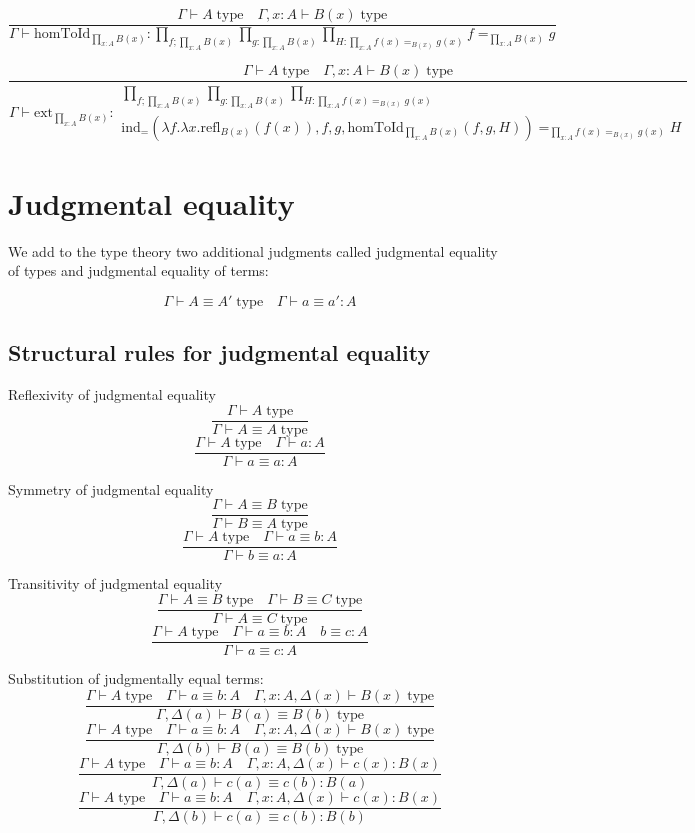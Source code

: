 \documentclass{book}
\begin{document}
$$\frac{\Gamma \vdash A \; \mathrm{type} \quad \Gamma, x:A \vdash B(x) \; \mathrm{type}}{\Gamma \vdash \mathrm{homToId}_{\prod_{x:A} B(x)}:\prod_{f;\prod_{x:A} B(x)} \prod_{g:\prod_{x:A} B(x)} \prod_{H:\prod_{x:A} f(x) =_{B(x)} g(x)} f =_{\prod_{x:A} B(x)} g}$$

$$\frac{\Gamma \vdash A \; \mathrm{type} \quad \Gamma, x:A \vdash B(x) \; \mathrm{type}}{\Gamma \vdash \mathrm{ext}_{\prod_{x:A} B(x)}:
\begin{array}{l}
	\prod_{f;\prod_{x:A} B(x)} \prod_{g:\prod_{x:A} B(x)} \prod_{H:\prod_{x:A} f(x) =_{B(x)} g(x)} \\
	\mathrm{ind}_{=}(\lambda f.\lambda x.\mathrm{refl}_{B(x)}(f(x)), f, g, \mathrm{homToId}_{\prod_{x:A} B(x)}(f, g, H)) =_{\prod_{x:A} f(x) =_{B(x)} g(x)} H
\end{array}
}$$

\section{Judgmental equality}

We add to the type theory two additional judgments called judgmental equality of types and judgmental equality of terms:

$$\Gamma \vdash A \equiv A' \; \mathrm{type} \quad \Gamma \vdash a \equiv a':A$$

\subsection{Structural rules for judgmental equality}

Reflexivity of judgmental equality
$$\frac{\Gamma \vdash A \; \mathrm{type}}{\Gamma \vdash A \equiv A \; \mathrm{type}}$$
$$\frac{\Gamma \vdash A \; \mathrm{type} \quad \Gamma \vdash a:A}{\Gamma \vdash a \equiv a:A}$$

Symmetry of judgmental equality
$$\frac{\Gamma \vdash A \equiv B \; \mathrm{type}}{\Gamma \vdash B \equiv A \; \mathrm{type}}$$ 
$$\frac{\Gamma \vdash A \; \mathrm{type} \quad \Gamma \vdash a \equiv b:A}{\Gamma \vdash b \equiv a:A}$$

Transitivity of judgmental equality
$$\frac{\Gamma \vdash A \equiv B \; \mathrm{type} \quad \Gamma \vdash B \equiv C \; \mathrm{type} }{\Gamma \vdash A \equiv C \; \mathrm{type}}$$
$$\frac{\Gamma \vdash A \; \mathrm{type} \quad \Gamma \vdash a \equiv b:A \quad b \equiv c:A }{\Gamma \vdash a \equiv c:A}$$

Substitution of judgmentally equal terms:
$$\frac{\Gamma \vdash A \; \mathrm{type} \quad \Gamma \vdash a \equiv b : A \quad \Gamma, x:A, \Delta(x) \vdash B(x) \; \mathrm{type}}{\Gamma, \Delta(a) \vdash B(a) \equiv B(b) \; \mathrm{type}}$$
$$\frac{\Gamma \vdash A \; \mathrm{type} \quad \Gamma \vdash a \equiv b : A \quad \Gamma, x:A, \Delta(x) \vdash B(x) \; \mathrm{type}}{\Gamma, \Delta(b) \vdash B(a) \equiv B(b) \; \mathrm{type}}$$
$$\frac{\Gamma \vdash A \; \mathrm{type} \quad \Gamma \vdash a \equiv b : A \quad \Gamma, x:A, \Delta(x) \vdash c(x):B(x)}{\Gamma, \Delta(a) \vdash c(a) \equiv c(b): B(a)}$$
$$\frac{\Gamma \vdash A \; \mathrm{type} \quad \Gamma \vdash a \equiv b : A \quad \Gamma, x:A, \Delta(x) \vdash c(x):B(x)}{\Gamma, \Delta(b) \vdash c(a) \equiv c(b): B(b)}$$
\end{document}
